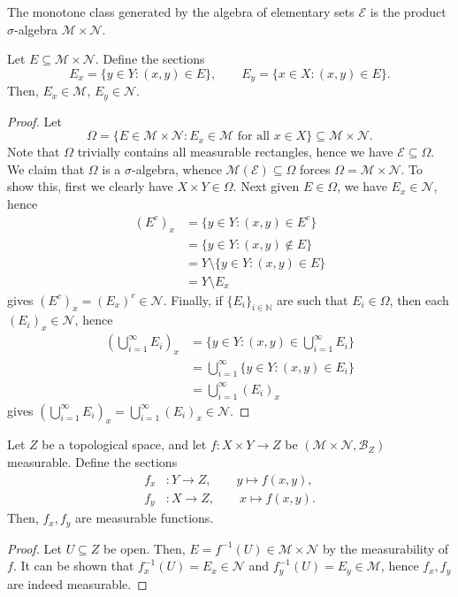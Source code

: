 \documentclass[11pt]{article}
\newcommand{\N}{\mathbb{N}}
\newcommand{\M}{\mathcal{M}}
\newcommand{\MN}{\mathcal{N}}
\theoremstyle{definition}
\theoremstyle{remark}
\numberwithin{equation}{section}
\begin{document}
    \begin{corollary}
        The monotone class generated by the algebra of elementary sets $\mathcal{E}$
        is the product $\sigma$-algebra $\M \times \MN$.
    \end{corollary}

    \begin{theorem}
        Let $E \subseteq \M \times \MN$. Define the sections \[
            E_x = \{y \in Y: (x, y) \in E\}, \qquad
            E_y = \{x \in X: (x, y) \in E\}.
        \] Then, $E_x \in \M$, $E_y \in \MN$.
    \end{theorem}
    \begin{proof}
        Let \[
            \Omega = \{E \in \M \times \MN: E_x \in \M\text{ for all } x \in X\}
            \subseteq \M \times \MN.
        \] Note that $\Omega$ trivially contains all measurable rectangles, hence we
        have $\mathcal{E} \subseteq \Omega$. We claim that $\Omega$ is a
        $\sigma$-algebra, whence $\M(\mathcal{E}) \subseteq \Omega$ forces $\Omega =
        \M \times \MN$. To show this, first we clearly have $X \times Y \in \Omega$.
        Next given $E \in \Omega$, we have $E_x \in \MN$, hence \begin{align*}
            (E^c)_x &= \{y \in Y: (x, y) \in E^c\} \\
            &= \{y \in Y: (x, y) \notin E\} \\
            &= Y \setminus \{y \in Y: (x, y) \in E\} \\
            &= Y\setminus E_x
        \end{align*} gives $(E^c)_x = (E_x)^c \in \MN$. Finally, if $\{E_i\}_{i \in
        \N}$ are such that $E_i \in \Omega$, then each $(E_i)_x \in \MN$, hence
        \begin{align*}
            \left(\bigcup_{i = 1}^\infty E_i\right)_x &= \{y \in Y: (x, y) \in
            \bigcup_{i = 1}^\infty E_i\} \\
            &= \bigcup_{i = 1}^\infty \{y \in Y: (x, y) \in E_i\} \\
            &= \bigcup_{i = 1}^\infty (E_i)_x
        \end{align*} gives $(\bigcup_{i = 1}^\infty E_i)_x = \bigcup_{i = 1}^\infty
        (E_i)_x \in \MN$.
    \end{proof}


    \begin{theorem}
        Let $Z$ be a topological space, and let $f\colon X \times Y \to Z$ be
        $(\M\times \MN, \mathcal{B}_Z)$ measurable. Define the sections \begin{align*}
            f_x&\colon Y \to Z, \qquad y \mapsto f(x, y), \\
            f_y&\colon X \to Z, \qquad x \mapsto f(x, y).
        \end{align*}
        Then, $f_x, f_y$ are measurable functions.
    \end{theorem}
    \begin{proof}
        Let $U\subseteq Z$ be open. Then, $E = f^{-1}(U) \in \M \times \MN$ by the
        measurability of $f$. It can be shown that $f_x^{-1}(U) = E_x \in \MN$ and
        $f_y^{-1}(U) = E_y \in \M$, hence $f_x, f_y$ are indeed measurable.
    \end{proof}
\end{document}
